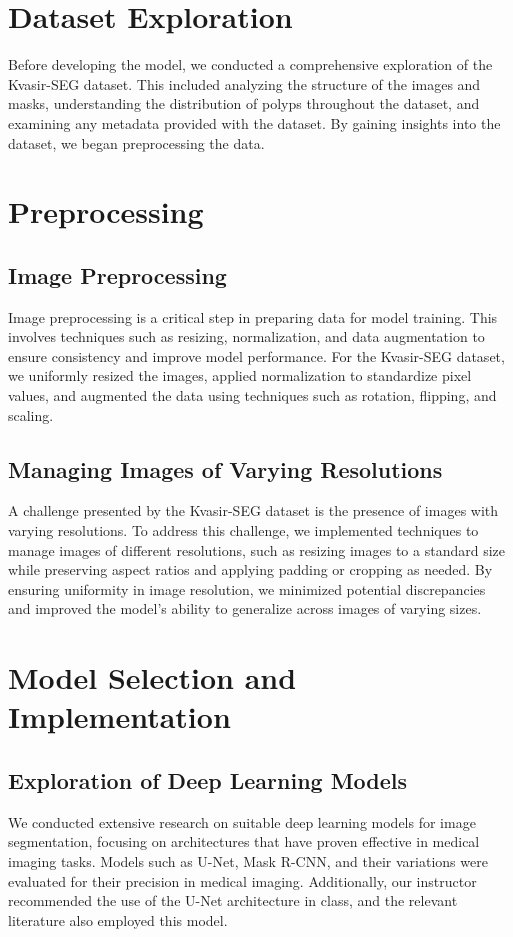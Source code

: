 \documentclass[12pt]{article}
\begin{document}
\section{Dataset Exploration}
Before developing the model, we conducted a comprehensive exploration of the Kvasir-SEG dataset. This included analyzing the structure of the images and masks, understanding the distribution of polyps throughout the dataset, and examining any metadata provided with the dataset. By gaining insights into the dataset, we began preprocessing the data.




\section{Preprocessing}
\subsection{Image Preprocessing}
Image preprocessing is a critical step in preparing data for model training. This involves techniques such as resizing, normalization, and data augmentation to ensure consistency and improve model performance. For the Kvasir-SEG dataset, we uniformly resized the images, applied normalization to standardize pixel values, and augmented the data using techniques such as rotation, flipping, and scaling.

\subsection{Managing Images of Varying Resolutions}
A challenge presented by the Kvasir-SEG dataset is the presence of images with varying resolutions. To address this challenge, we implemented techniques to manage images of different resolutions, such as resizing images to a standard size while preserving aspect ratios and applying padding or cropping as needed. By ensuring uniformity in image resolution, we minimized potential discrepancies and improved the model's ability to generalize across images of varying sizes.

\section{Model Selection and Implementation}
\subsection{Exploration of Deep Learning Models}
We conducted extensive research on suitable deep learning models for image segmentation, focusing on architectures that have proven effective in medical imaging tasks. Models such as U-Net, Mask R-CNN, and their variations were evaluated for their precision in medical imaging. Additionally, our instructor recommended the use of the U-Net architecture in class, and the relevant literature also employed this model.
\end{document}
